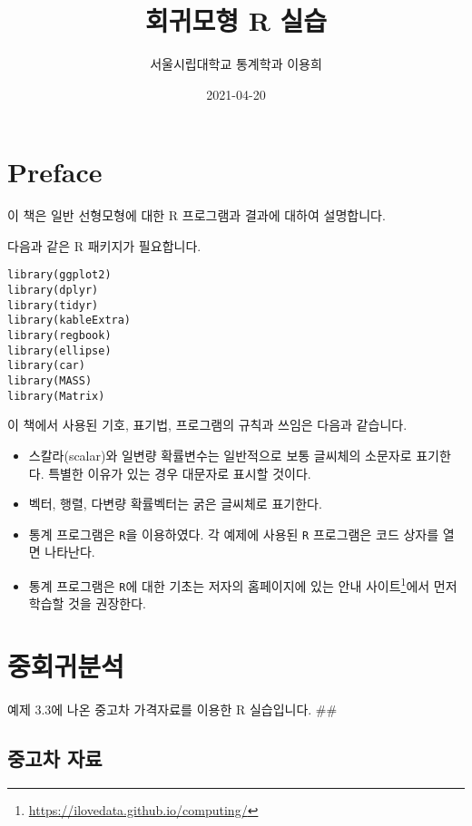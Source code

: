 \documentclass[
]{book}
\title{회귀모형 R 실습}
\author{서울시립대학교 통계학과 이용희}
\date{2021-04-20}
\makeatletter
\providecommand{\tightlist}{%
  \setlength{\itemsep}{0pt}\setlength{\parskip}{0pt}}
\renewcommand{\href}[2]{#2\footnote{\url{#1}}}
\newenvironment{kframe}{%
\medskip{}
\setlength{\fboxsep}{.8em}
 \def\at@end@of@kframe{}%
 \ifinner\ifhmode%
  \def\at@end@of@kframe{\end{minipage}}%
  \begin{minipage}{\columnwidth}%
 \fi\fi%
 \def\FrameCommand##1{\hskip\@totalleftmargin \hskip-\fboxsep
 \colorbox{shadecolor}{##1}\hskip-\fboxsep
     \hskip-\linewidth \hskip-\@totalleftmargin \hskip\columnwidth}%
 \MakeFramed {\advance\hsize-\width
   \@totalleftmargin\z@ \linewidth\hsize
   \@setminipage}}%
 {\par\unskip\endMakeFramed%
 \at@end@of@kframe}
\newenvironment{rmdblock}[1]
  {
  \begin{itemize}
  \renewcommand{\labelitemi}{
    \raisebox{-.7\height}[0pt][0pt]{
      {\setkeys{Gin}{width=3em,keepaspectratio}\texttt{[image: images/\#1]}}
    }
  }
  \setlength{\fboxsep}{1em}
  \begin{kframe}
  \item
  }
  {
  \end{kframe}
  \end{itemize}
  }
\newenvironment{rmdimportant}
  {\begin{rmdblock}{important}}
  {\end{rmdblock}}
\makeatother
\begin{document}
\maketitle

{
\setcounter{tocdepth}{1}
\tableofcontents
}
\hypertarget{preface}{%
\chapter*{Preface}\label{preface}}


이 책은 일반 선형모형에 대한 R 프로그램과 결과에 대하여 설명합니다.

다음과 같은 R 패키지가 필요합니다.

\begin{verbatim}
library(ggplot2)
library(dplyr)
library(tidyr)
library(kableExtra)
library(regbook)
library(ellipse)
library(car)
library(MASS)
library(Matrix)
\end{verbatim}

\begin{rmdimportant}
이 책에서 사용된 기호, 표기법, 프로그램의 규칙과 쓰임은 다음과 같습니다.

\begin{itemize}
\tightlist
\item
  스칼라(scalar)와 일변량 확률변수는 일반적으로 보통 글씨체의 소문자로 표기한다. 특별한 이유가 있는 경우 대문자로 표시할 것이다.
\item
  벡터, 행렬, 다변량 확률벡터는 굵은 글씨체로 표기한다.
\item
  통계 프로그램은 \texttt{R}을 이용하였다. 각 예제에 사용된 \texttt{R} 프로그램은 코드 상자를 열면 나타난다.
\item
  통계 프로그램은 \texttt{R}에 대한 기초는 저자의 홈페이지에 있는 \href{https://ilovedata.github.io/computing/}{안내 사이트}에서 먼저 학습할 것을 권장한다.
\end{itemize}
\end{rmdimportant}

\mainmatter

\hypertarget{chapter03}{%
\chapter{중회귀분석}\label{chapter03}}

예제 3.3에 나온 중고차 가격자료를 이용한 R 실습입니다.
\#\#

\hypertarget{uxc911uxace0uxcc28-uxc790uxb8cc}{%
\section{중고차 자료}\label{uxc911uxace0uxcc28-uxc790uxb8cc}}
\end{document}
